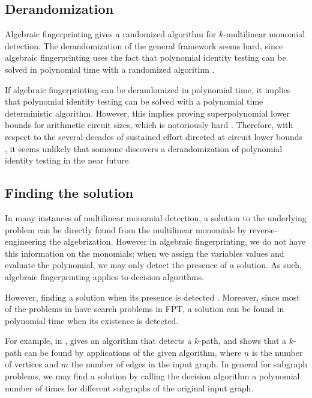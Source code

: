 \subsection{Derandomization}
\label{sect:derandomization}

Algebraic fingerprinting gives a randomized algorithm for $k$-multilinear monomial detection. 
The derandomization of the general framework seems hard, since algebraic fingerprinting 
uses the fact that polynomial identity testing can be solved in polynomial time with 
a randomized algorithm \cite{Williams09}.

If algebraic fingerprinting can be derandomized 
in polynomial time, it implies that polynomial identity testing can be solved with a 
polynomial time deterministic algorithm. However, this implies proving superpolynomial 
lower bounds for arithmetic circuit sizes, which is notoriously hard \cite{Kabanets03}. 
Therefore, with respect to the several decades of 
sustained effort directed at circuit lower bounds \cite{Kabanets03}, 
it seems unlikely that someone discovers a derandomization of polynomial identity testing 
in the near future.

\subsection{Finding the solution}
\label{sect:finding_the_solution}

In many instances of multilinear monomial detection, 
a solution to the underlying problem can be directly found 
from the multilinear monomials by 
reverse-engineering the algebrization. 
However in algebraic fingerprinting, we do not have this information on the monomials: 
when we assign the variables values and evaluate the polynomial, we may only detect the 
presence of a solution. As such, algebraic fingerprinting applies to decision algorithms.

However, finding a solution when its presence is detected
. 
Moreover, since most of the problems in  
have search problems in FPT, a solution can be found in polynomial time when its 
existence is detected.

For example, in \cite{Koutis08}, 
\cite{Koutis08} gives an algorithm that detects a $k$-path, and shows that a 
$k$-path can be found by  applications of the given
algorithm, where $n$ is the number of vertices and $m$ the number of edges in the input graph. 
In general for subgraph problems, we may find a solution by calling the decision 
algorithm a polynomial number of times for different subgraphs of the original input graph.

